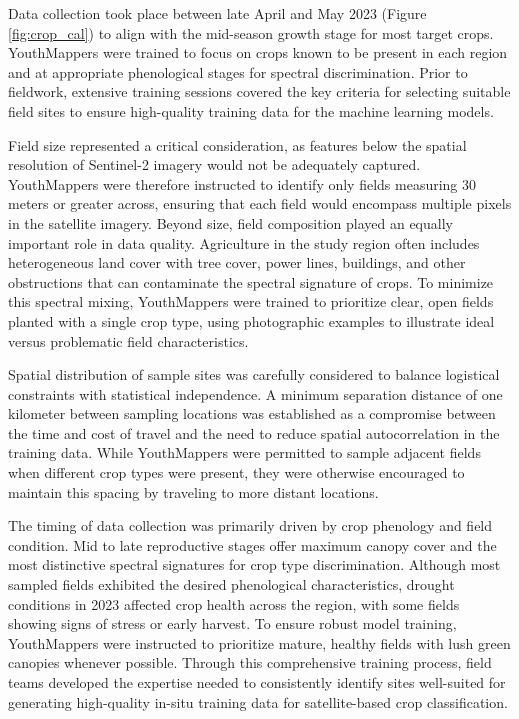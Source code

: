 \documentclass[
  journal,
  twocolumn]{IEEEtran}
\begin{document}
Data collection took place between late April and May 2023 (Figure
\ref{fig:crop_cal}) to align with the mid-season growth stage for most
target crops. YouthMappers were trained to focus on crops known to be
present in each region and at appropriate phenological stages for
spectral discrimination. Prior to fieldwork, extensive training sessions
covered the key criteria for selecting suitable field sites to ensure
high-quality training data for the machine learning models.

Field size represented a critical consideration, as features below the
spatial resolution of Sentinel-2 imagery would not be adequately
captured. YouthMappers were therefore instructed to identify only fields
measuring 30 meters or greater across, ensuring that each field would
encompass multiple pixels in the satellite imagery. Beyond size, field
composition played an equally important role in data quality.
Agriculture in the study region often includes heterogeneous land cover
with tree cover, power lines, buildings, and other obstructions that can
contaminate the spectral signature of crops. To minimize this spectral
mixing, YouthMappers were trained to prioritize clear, open fields
planted with a single crop type, using photographic examples to
illustrate ideal versus problematic field characteristics.

Spatial distribution of sample sites was carefully considered to balance
logistical constraints with statistical independence. A minimum
separation distance of one kilometer between sampling locations was
established as a compromise between the time and cost of travel and the
need to reduce spatial autocorrelation in the training data. While
YouthMappers were permitted to sample adjacent fields when different
crop types were present, they were otherwise encouraged to maintain this
spacing by traveling to more distant locations.

The timing of data collection was primarily driven by crop phenology and
field condition. Mid to late reproductive stages offer maximum canopy
cover and the most distinctive spectral signatures for crop type
discrimination. Although most sampled fields exhibited the desired
phenological characteristics, drought conditions in 2023 affected crop
health across the region, with some fields showing signs of stress or
early harvest. To ensure robust model training, YouthMappers were
instructed to prioritize mature, healthy fields with lush green canopies
whenever possible. Through this comprehensive training process, field
teams developed the expertise needed to consistently identify sites
well-suited for generating high-quality in-situ training data for
satellite-based crop classification.
\end{document}

